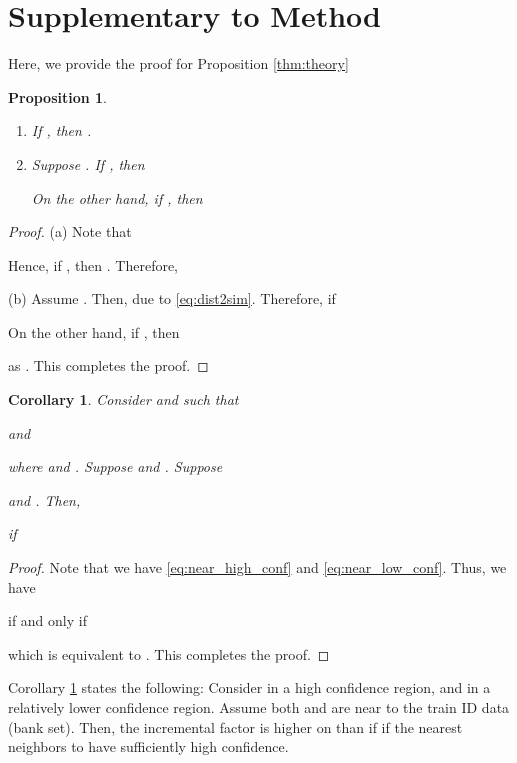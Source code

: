\documentclass[10pt,twocolumn,letterpaper]{article}
\newtheorem{prop}[thm]{Proposition}
\newtheorem{cor}[thm]{Corollary}
\begin{document}
{\small


}



\clearpage

\appendix

\onecolumn

\setcounter{thm}{0}

\section{Supplementary to Method}

Here, we provide the proof for Proposition \ref{thm:theory}

\begin{prop}

\begin{enumerate}
\item[(a)] If , then .
\item[(b)] Suppose . 
If , then

On the other hand, if , then

\end{enumerate}
\end{prop}

\begin{proof}
(a) Note that 

Hence, if , then . Therefore,
 
(b) Assume .
Then,  due to \eqref{eq:dist2sim}. Therefore, if 

On the other hand, if , then

as . This completes the proof.
\end{proof}


\begin{cor}
\label{thm:theory_cor}
Consider  and  such that

and

where  and .
Suppose
 and .
Suppose 

and
. Then,

if 

\end{cor}

\begin{proof}
Note that we have \eqref{eq:near_high_conf} and \eqref{eq:near_low_conf}.
Thus, we have 

if and only if

which is equivalent to . This completes the proof.
\end{proof}

Corollary \ref{thm:theory_cor} states the following: Consider  in a high confidence region, and  in a relatively lower confidence region. Assume both  and  are near to the train ID data (\ie bank set). Then, the incremental factor is higher on  than  if  if the nearest neighbors to  have sufficiently high confidence.
\end{document}
